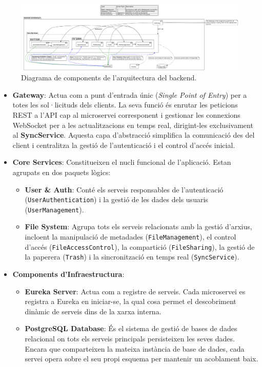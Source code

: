 \begin{figure}
    \centering
    \includegraphics[width=\textwidth]{Figures/backend_component_diagram.png}
    \caption{Diagrama de components de l'arquitectura del backend.}
    \label{fig:backend_component_diagram}
\end{figure}

\begin{itemize}
    \item \textbf{Gateway}: Actua com a punt d'entrada únic (\textit{Single Point of Entry}) per a totes les sol·licituds dels clients. La seva funció és enrutar les peticions REST a l'API cap al microservei corresponent i gestionar les connexions WebSocket per a les actualitzacions en temps real, dirigint-les exclusivament al \textbf{SyncService}. Aquesta capa d'abstracció simplifica la comunicació des del client i centralitza la gestió de l'autenticació i el control d'accés inicial.

    \item \textbf{Core Services}: Constitueixen el nucli funcional de l'aplicació. Estan agrupats en dos paquets lògics:
    \begin{itemize}
        \item \textbf{User \& Auth}: Conté els serveis responsables de l'autenticació (\texttt{UserAuthentication}) i la gestió de les dades dels usuaris (\texttt{UserManagement}).
        \item \textbf{File System}: Agrupa tots els serveis relacionats amb la gestió d'arxius, incloent la manipulació de metadades (\texttt{FileManagement}), el control d'accés (\texttt{FileAccessControl}), la compartició (\texttt{FileSharing}), la gestió de la paperera (\texttt{Trash}) i la sincronització en temps real (\texttt{SyncService}).
    \end{itemize}

    \item \textbf{Components d'Infraestructura}:
    \begin{itemize}
        \item \textbf{Eureka Server}: Actua com a registre de serveis. Cada microservei es registra a Eureka en iniciar-se, la qual cosa permet el descobriment dinàmic de serveis dins de la xarxa interna.
        \item \textbf{PostgreSQL Database}: És el sistema de gestió de bases de dades relacional on tots els serveis principals persisteixen les seves dades. Encara que comparteixen la mateixa instància de base de dades, cada servei opera sobre el seu propi esquema per mantenir un acoblament baix.
    \end{itemize}


\end{itemize}
